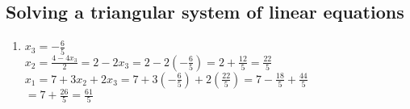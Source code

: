 \documentclass{article}
\begin{document}
    \subsection{Solving a triangular system of linear equations}
    \begin{enumerate}
        \addtocounter{enumi}{2}
        \item $x_3 = -\frac{6}{5}$ \\
            $x_2 = \frac{4 - 4x_3}{2} = 2 - 2x_3 = 2 - 2(-\frac{6}{5}) = 2 + \frac{12}{5} = \frac{22}{5}$ \\
            $x_1 = 7 + 3x_2 + 2x_3 = 7 + 3(-\frac{6}{5}) + 2(\frac{22}{5}) = 7 - \frac{18}{5} + \frac{44}{5}$\\
            $= 7 + \frac{26}{5} = \frac{61}{5}$
    \end{enumerate}
\end{document}
